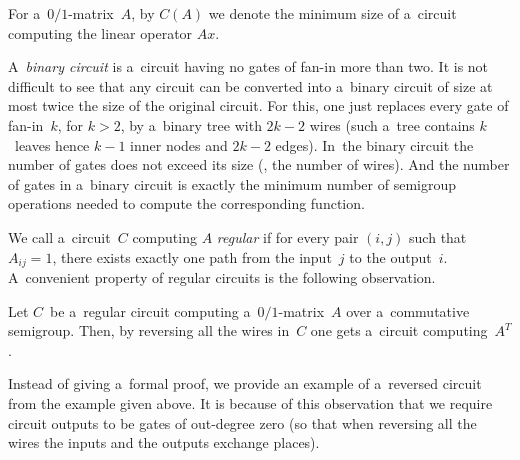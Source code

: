 For a~$0/1$-matrix~$A$, by $C(A)$ we denote the minimum size of
a~circuit computing the linear operator $Ax$.


A~\emph{binary circuit} is a~circuit having no gates of fan-in more than two. It
is not difficult to see that any circuit can be converted into a~binary circuit
of size at most twice the size of the original circuit.  For this, one just
replaces every gate of fan-in~$k$, for $k>2$, by a~binary tree with $2k-2$ wires
(such a~tree contains $k$~leaves hence $k-1$ inner nodes and $2k-2$ edges).
In~the binary circuit the number of gates does not exceed its size
(\ie, the number of wires). And the number of gates in a~binary
circuit is exactly the minimum number of semigroup operations needed to
compute the corresponding function.

%
%
%
%
%
%
%
We call a~circuit~$C$ computing $A$ \emph{regular} if for every pair $(i,j)$
such that $A_{ij}=1$, there exists exactly one path from the input~$j$ to the
output~$i$. A~convenient property of regular circuits is the following
observation.

%
%
%
%
\begin{observation}\label{obs:transpose}
Let $C$~be a~regular circuit computing a~$0/1$-matrix~$A$ over a~commutative
semigroup. Then, by reversing all the wires in~$C$ one gets a~circuit
computing~$A^T$.
\end{observation}

Instead of giving a~formal proof, we provide an example of a~reversed circuit
from the example given above. It is because of this observation that we require
circuit outputs to be gates of out-degree zero (so that when reversing all the
wires the inputs and the outputs exchange places).

\begin{center}
\end{center}

